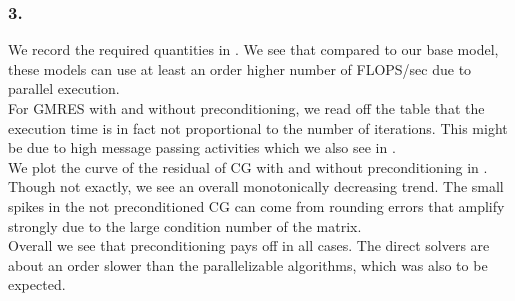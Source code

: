 \subsubsection*{3.}
\FloatBarrier
We record the required quantities in . We see that compared to our base model, these models can use at least an order higher number of FLOPS/sec due to parallel execution.
\\
For GMRES with and without preconditioning, we read off the table that the execution time is in fact not proportional to the number of iterations. This might be due to high message passing activities which we also see in .
\\
We plot the curve of the residual of CG with and without preconditioning in . Though not exactly, we see an overall monotonically decreasing trend. The small spikes in the not preconditioned CG can come from rounding errors that amplify strongly due to the large condition number of the matrix.
\\
Overall we see that preconditioning pays off in all cases. The direct solvers are about an order slower than the parallelizable algorithms, which was also to be expected.

